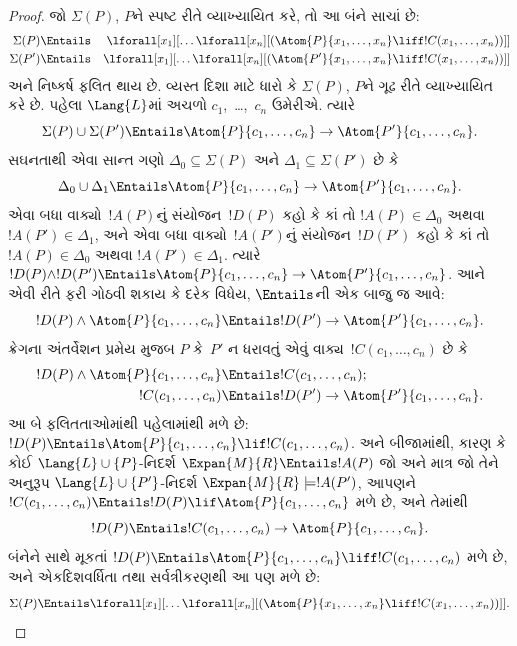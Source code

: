 \begin{proof}
જો $\Sigma(P)$, $P$ને સ્પષ્ટ રીતે વ્યાખ્યાયિત કરે, તો આ બંને સાચાં
છે:
\begin{align*}
  \Sigma(P) & \Entails & \lforall[x_1][\dots \lforall[x_n]
    [(\Atom{P}{x_1,\dots, x_n} \liff !C(x_1,\dots,x_n))]]\\
  \Sigma(P') & \Entails & \lforall[x_1][\dots \lforall[x_n]
    [(\Atom{P'}{x_1,\dots, x_n} \liff !C(x_1,\dots,x_n))]]
\end{align*}
અને નિષ્કર્ષ ફલિત થાય છે. વ્યસ્ત દિશા માટે ધારો કે $\Sigma(P)$,
$P$ને ગૂઢ રીતે વ્યાખ્યાયિત કરે છે. પહેલા $\Lang{L}$માં અચળો
$c_1$,~\dots,~$c_n$ ઉમેરીએ. ત્યારે
\[
\Sigma(P) \cup \Sigma(P') \Entails
\Atom{P}{c_1, \dots, c_n} \to \Atom{P'}{c_1, \dots, c_n}.
\]
સઘનતાથી એવા સાન્ત ગણો $\Delta_0\subseteq\Sigma(P)$ અને
$\Delta_1\subseteq\Sigma(P')$ છે કે
\[
\Delta_0 \cup \Delta_1 \Entails
\Atom{P}{c_1, \dots, c_n} \to \Atom{P'}{c_1, \dots, c_n}.
\]
એવા બધા વાક્યો~$!A(P)$નું સંયોજન~$!D(P)$ કહો કે કાં તો
$!A(P)\in\Delta_0$ અથવા $!A(P')\in\Delta_1$, અને એવા બધા
વાક્યો~$!A(P')$નું સંયોજન~$!D(P')$ કહો કે કાં તો
$!A(P)\in\Delta_0$ અથવા $!A(P')\in\Delta_1$. ત્યારે
$!D(P)\land !D(P')\Entails\Atom{P}{c_1,\dots,c_n}\to
\Atom{P'}{c_1,\dots,c_n}$. આને એવી રીતે ફરી ગોઠવી શકાય કે દરેક
વિધેય, $\Entails$ની એક બાજુ જ આવે:
\[
!D(P) \land \Atom{P}{c_1, \dots, c_n} \Entails
!D(P') \to \Atom{P'}{c_1, \dots, c_n}.
\]
ક્રેગના અંતર્વેશન પ્રમેય મુજબ $P$ કે~$P'$ ન ધરાવતું એવું
વાક્ય~$!C(c_1,\dots,c_n)$ છે કે
\begin{align*}
  !D(P) \land \Atom{P}{c_1, \dots, c_n} & \Entails !C(c_1,\dots, c_n); \\
  !C(c_1,\dots, c_n) & \Entails !D(P') \to \Atom{P'}{c_1, \dots, c_n}.
\end{align*}
આ બે ફલિતતાઓમાંથી પહેલામાંથી મળે છે: $!D(P)\Entails
\Atom{P}{c_1,\dots,c_n}\lif !C(c_1,\dots,c_n)$. અને બીજામાંથી,
કારણ કે કોઈ $\Lang{L}\cup\{P\}$-નિદર્શ $\Expan{M}{R}\Entails
!A(P)$ જો અને માત્ર જો તેને અનુરૂપ $\Lang{L}\cup\{P'\}$-નિદર્શ
$\Expan{M}{R}\models !A(P')$, આપણને
$!C(c_1,\dots,c_n)\Entails !D(P)\lif\Atom{P}{c_1,\dots,c_n}$ મળે છે,
અને તેમાંથી
\[
!D(P) \Entails !C(c_1,\dots,c_n) \to \Atom{P}{c_1,\dots, c_n}.
\]
બંનેને સાથે મૂકતાં $!D(P)\Entails\Atom{P}{c_1,\dots,c_n}\liff
!C(c_1,\dots,c_n)$ મળે છે, અને એકદિશવર્ધિતા તથા સર્વત્રીકરણથી આ પણ
મળે છે:
\[
\Sigma(P) \Entails
\lforall[x_1][\dots\lforall[x_n][(\Atom{P}{x_1,\dots, x_n} \liff
    !C(x_1,\dots, x_n))]].
\]
\end{proof}
\endgroup


